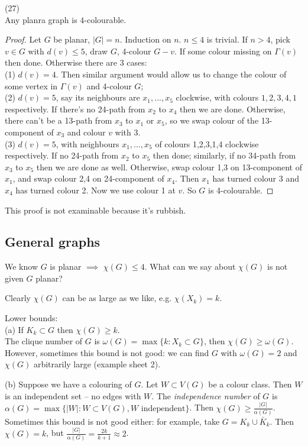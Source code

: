 \documentclass[a4paper]{article}
\begin{document}
\begin{thm} (27)\\
Any planra graph is $4$-colourable.
\begin{proof}
Let $G$ be planar, $|G| = n$. Induction on $n$. $n\leq 4$ is trivial. If $n>4$, pick $v \in G$ with $d(v) \leq 5$, draw $G$, 4-colour $G-v$. If some colour missing on $\Gamma(v)$ then done. Otherwise there are 3 cases:\\
(1) $d(v) = 4$. Then similar argument would allow us to change the colour of some vertex in $\Gamma(v)$ and 4-colour $G$;\\
(2) $d(v) = 5$, say its neighbours are $x_1,...,x_5$ clockwise, with colours $1,2,3,4,1$ respectively. If there's no 24-path from $x_2$ to $x_4$ then we are done. Otherwise, there can't be a 13-path from $x_3$ to $x_1$ or $x_5$, so we swap colour of the 13-component of $x_3$ and colour $v$ with 3.\\
(3) $d(v) = 5$, with neighbours $x_1,...,x_5$ of colours 1,2,3,1,4 clockwise respectively. If no 24-path from $x_2$ to $x_5$ then done; similarly, if no 34-path from $x_3$ to $x_5$ then we are done as well. Otherwise, swap colour 1,3 on 13-component of $x_1$, and swap colour 2,4 on 24-component of $x_4$. Then $x_1$ has turned colour 3 and $x_4$ has turned colour 2. Now we use colour 1 at $v$. So $G$ is 4-colourable.
\end{proof}
\end{thm}

\begin{rem}
This proof is not examinable because it's rubbish. 
\end{rem}

\subsection{General graphs}
We know $G$ is planar $\implies$ $\chi(G) \leq 4$. What can we say about $\chi(G)$ is not given $G$ planar?

Clearly $\chi(G)$ can be as large as we like, e.g. $\chi(X_k) = k$.

Lower bounds:\\
(a) If $K_k \subset G$ then $\chi(G) \geq k$.\\
The clique number of $G$ is $\omega(G) = \max\{k:X_k \subset G\}$, then $\chi(G) \geq \omega(G)$. However, sometimes this bound is not good: we can find $G$ with $\omega(G) = 2$ and $\chi(G)$ arbitrarily large (example sheet 2).

(b) Suppose we have a colouring of $G$. Let $W \subset V(G)$ be a colour class. Then $W$ is an independent set -- no edges with $W$. The \emph{independence number} of $G$ is $\alpha(G) = \max \{|W|:W \subset V(G), W \text{ independent} \}$. Then $\chi(G) \geq \frac{|G|}{\alpha(G)}$. Sometimes this bound is not good either: for example, take $G = K_k \cup \bar{K}_k$. Then $\chi(G) = k$, but $\frac{|G|}{\alpha(G)} = \frac{2k}{k+1} \approx 2$.
\end{document}
